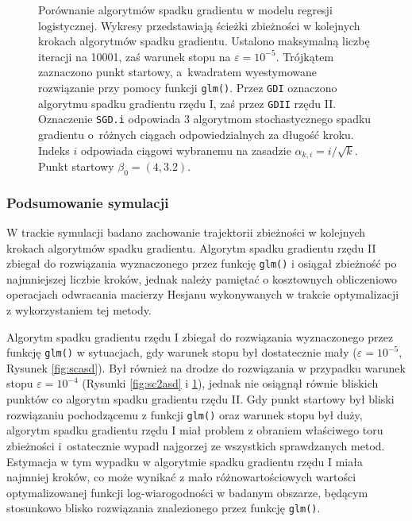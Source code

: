 \begin{figure}[hbt!]
  \caption[Porównanie algorytmów spadku gradientu dla punktu startowego $\beta_0 = (4,3.2)$.]{\label{fig:sc4asd}Porównanie algorytmów spadku gradientu w modelu regresji logistycznej. Wykresy przedstawiają ścieżki zbieżności w kolejnych krokach algorytmów spadku gradientu. Ustalono maksymalną liczbę iteracji na 10001, zaś warunek stopu na $\varepsilon=10^{-5}$. Trójkątem zaznaczono punkt startowy, a~kwadratem wyestymowane rozwiązanie przy pomocy funkcji \texttt{glm()}. Przez \texttt{GDI} oznaczono algorytmu spadku gradientu rzędu I, zaś przez \texttt{GDII} rzędu II. Oznaczenie \texttt{SGD.i} odpowiada 3 algorytmom stochastycznego spadku gradientu o~różnych ciągach odpowiedzialnych za długość kroku. Indeks $i$ odpowiada ciągowi wybranemu na zasadzie $\alpha_{k,i} = i/\sqrt{k}$. Punkt startowy $\beta_0 = (4,3.2)$.}
\end{figure}


\newpage

\subsubsection{Podsumowanie symulacji}
W trackie symulacji badano zachowanie trajektorii zbieżności w kolejnych krokach algorytmów spadku gradientu. Algorytm spadku gradientu rzędu II zbiegał do rozwiązania wyznaczonego przez funkcję \texttt{glm()} i osiągał zbieżność po najmniejszej liczbie kroków, jednak należy pamiętać o kosztownych obliczeniowo operacjach odwracania macierzy Hesjanu wykonywanych w trakcie optymalizacji z wykorzystaniem tej metody. 

Algorytm spadku gradientu rzędu I zbiegał do rozwiązania wyznaczonego przez funkcję \texttt{glm()} w sytuacjach, gdy warunek stopu był dostatecznie mały ($\varepsilon = 10^{-5}$, Rysunek \ref{fig:scasd}). Był również na drodze do rozwiązania w przypadku warunek stopu $\varepsilon = 10^{-4}$ (Rysunki \ref{fig:sc2asd} i \ref{fig:sc4asd}), jednak nie osiągnął równie bliskich punktów co algorytm spadku gradientu rzędu II. Gdy punkt startowy był bliski rozwiązaniu pochodzącemu z funkcji \texttt{glm()} oraz warunek stopu był duży, algorytm spadku gradientu rzędu I miał problem z obraniem właściwego toru zbieżności i~ostatecznie wypadł najgorzej ze wszystkich sprawdzanych metod. Estymacja w tym wypadku w algorytmie spadku gradientu rzędu I miała najmniej kroków, co może wynikać z mało różnowartościowych wartości optymalizowanej funkcji log-wiarogodności w badanym obszarze, będącym stosunkowo blisko rozwiązania znalezionego przez funkcję \texttt{glm()}.

